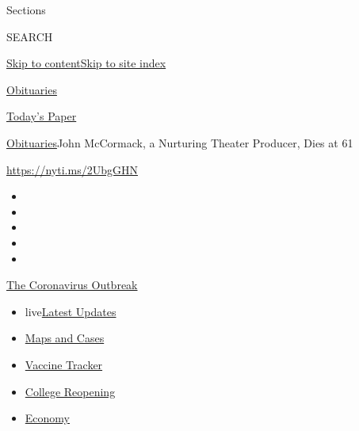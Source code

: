 Sections

SEARCH

\protect\hyperlink{site-content}{Skip to
content}\protect\hyperlink{site-index}{Skip to site index}

\href{https://www.nytimes3xbfgragh.onion/section/obituaries}{Obituaries}

\href{https://myaccount.nytimes3xbfgragh.onion/auth/login?response_type=cookie\&client_id=vi}{}

\href{https://www.nytimes3xbfgragh.onion/section/todayspaper}{Today's
Paper}

\href{/section/obituaries}{Obituaries}\textbar{}John McCormack, a
Nurturing Theater Producer, Dies at 61

\url{https://nyti.ms/2UbgGHN}

\begin{itemize}
\item
\item
\item
\item
\item
\end{itemize}

\href{https://www.nytimes3xbfgragh.onion/news-event/coronavirus?action=click\&pgtype=Article\&state=default\&region=TOP_BANNER\&context=storylines_menu}{The
Coronavirus Outbreak}

\begin{itemize}
\tightlist
\item
  live\href{https://www.nytimes3xbfgragh.onion/2020/08/04/world/coronavirus-covid-19.html?action=click\&pgtype=Article\&state=default\&region=TOP_BANNER\&context=storylines_menu}{Latest
  Updates}
\item
  \href{https://www.nytimes3xbfgragh.onion/interactive/2020/us/coronavirus-us-cases.html?action=click\&pgtype=Article\&state=default\&region=TOP_BANNER\&context=storylines_menu}{Maps
  and Cases}
\item
  \href{https://www.nytimes3xbfgragh.onion/interactive/2020/science/coronavirus-vaccine-tracker.html?action=click\&pgtype=Article\&state=default\&region=TOP_BANNER\&context=storylines_menu}{Vaccine
  Tracker}
\item
  \href{https://www.nytimes3xbfgragh.onion/2020/08/02/us/covid-college-reopening.html?action=click\&pgtype=Article\&state=default\&region=TOP_BANNER\&context=storylines_menu}{College
  Reopening}
\item
  \href{https://www.nytimes3xbfgragh.onion/live/2020/08/03/business/stock-market-today-coronavirus?action=click\&pgtype=Article\&state=default\&region=TOP_BANNER\&context=storylines_menu}{Economy}
\end{itemize}

